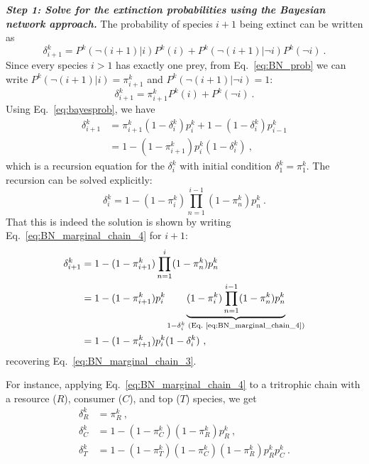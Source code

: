 \documentclass[11pt]{article}
\begin{document}
\textit{\textbf{Step 1: Solve for the extinction probabilities using the Bayesian network approach.}}
The probability of species $i+1$ being extinct can be written as
\begin{equation}
  \label{eq:BN_marginal_chain}
  \delta_{i+1}^k = P^k(\neg (i+1)|i) P^k(i) +
  P^k(\neg (i+1)|\neg i) P^k(\neg i) \ .
\end{equation}
Since every species $i>1$ has exactly one prey, from Eq.~\ref{eq:BN_prob} we can write $P^k(\neg (i+1)|i) = \pi_{i+1}^k$ and $P^k(\neg (i+1)|\neg i) = 1$:
\begin{equation}
  \label{eq:BN_marginal_chain_2}
  \delta_{i+1}^k = \pi_{i+1}^k P^k(i) + P^k(\neg i) \ .
\end{equation}
Using Eq.~\ref{eq:bayesprob}, we have
\begin{equation}
  \label{eq:BN_marginal_chain_3}
  \begin{split}
    \delta_{i+1}^k &= \pi_{i+1}^k (1-\delta_i^k)p_i^k + 1 - (1 - \delta_i^k)
    p_{i-1}^k \\ &= 1 - (1-\pi_{i+1}^k) p_i^k (1 - \delta_i^k) \ ,
  \end{split}
\end{equation}
which is a recursion equation for the $\delta_i^k$ with initial condition $\delta_1^k = \pi_1^k$. The recursion can be solved explicitly:
\begin{equation}
  \label{eq:BN_marginal_chain_4}
  \delta_i^k = 1 - (1 - \pi_i^k) \prod_{n=1}^{i-1} (1 - \pi_n^k) p_n^k \ .
\end{equation}
That this is indeed the solution is shown by writing Eq.~\ref{eq:BN_marginal_chain_4} for $i+1$:
\begin{equation}
  \label{eq:BN_marginal_chain_5}
  \begin{split}
    \delta_{i+1}^k &= 1 - (1 - \pi_{i+1}^k) \prod_{n=1}^{i} (1 - \pi_n^k) p_n^k
    \\ &= 1 - (1-\pi_{i+1}^k) p_i^k \underbrace{(1-\pi_i^k) \prod_{n=1}^{i-1}
      (1 - \pi_n^k) p_n^k}_{1 - \delta_i^k
      \text{ (Eq.~\ref{eq:BN_marginal_chain_4})}} \\ &=
    1 - (1-\pi_{i+1}^k) p_i^k (1 - \delta_i^k) \ ,
  \end{split}
\end{equation}
recovering Eq.~\ref{eq:BN_marginal_chain_3}.

For instance, applying Eq.~\ref{eq:BN_marginal_chain_4} to a tritrophic chain with a resource ($R$), consumer ($C$), and top ($T$) species, we get
\begin{align}
  \label{eq:BN_marginal_chain_R}
  \delta_R^k &= \pi_R^k \ , \\
  \label{eq:BN_marginal_chain_C}
  \delta_C^k &= 1 - (1 - \pi_C^k) (1 - \pi_R^k) p_R^k \ , \\
  \label{eq:BN_marginal_chain_T}
  \delta_T^k &= 1 - (1 - \pi_T^k) (1 - \pi_C^k) (1 - \pi_R^k) p_R^k p_C^k \ .
\end{align}
\end{document}
